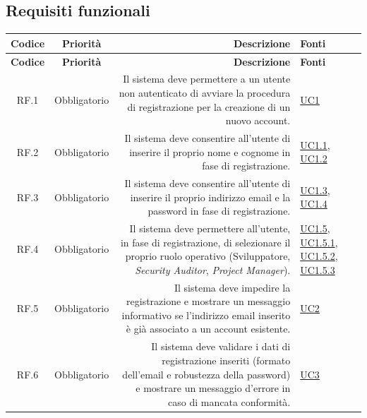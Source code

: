 \documentclass[12pt, a4paper]{article}
\begin{document}
\subsection{Requisiti funzionali}
\begingroup
\renewcommand{\arraystretch}{1.3}

\begin{xltabular}{\textwidth}{|c|c|D|F|}

    \hline
    \textbf{Codice} & \textbf{Priorità} & \textbf{Descrizione} & \textbf{Fonti} \\ 
    \hline
    \endfirsthead

    \hline
    \textbf{Codice} & \textbf{Priorità} & \textbf{Descrizione} & \textbf{Fonti} \\ 
    \hline
    \endhead

    RF.1 & Obbligatorio & Il sistema deve permettere a un utente non autenticato di avviare la procedura di registrazione per la creazione di un nuovo account. & \hyperref[uc:1]{UC1} \\ \hline
    
    RF.2 & Obbligatorio & Il sistema deve consentire all'utente di inserire il proprio nome e cognome in fase di registrazione. & \hyperref[uc:1.1]{UC1.1}, \hyperref[uc:1.2]{UC1.2} \\ \hline
    
    RF.3 & Obbligatorio & Il sistema deve consentire all'utente di inserire il proprio indirizzo email e la password in fase di registrazione. & \hyperref[uc:1.3]{UC1.3}, \hyperref[uc:1.4]{UC1.4} \\ \hline
    
    RF.4 & Obbligatorio & Il sistema deve permettere all'utente, in fase di registrazione, di selezionare il proprio ruolo operativo (Sviluppatore, \textit{Security Auditor}, \textit{Project Manager}). & \hyperref[uc:1.5]{UC1.5}, \hyperref[uc:1.5.1]{UC1.5.1}, \hyperref[uc:1.5.2]{UC1.5.2}, \hyperref[uc:1.5.3]{UC1.5.3} \\ \hline
    
    RF.5 & Obbligatorio & Il sistema deve impedire la registrazione e mostrare un messaggio informativo se l'indirizzo email inserito è già associato a un account esistente. & \hyperref[uc:2]{UC2} \\ \hline
    
    RF.6 & Obbligatorio & Il sistema deve validare i dati di registrazione inseriti (formato dell'email e robustezza della password) e mostrare un messaggio d'errore in caso di mancata conformità. & \hyperref[uc:3]{UC3} \\ \hline
    

\end{xltabular}
\end{document}
